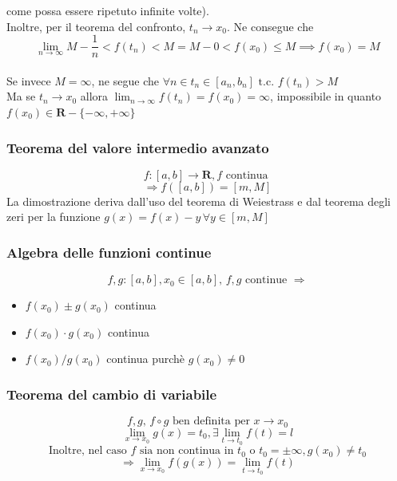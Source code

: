 \documentclass{report}
\begin{document}
                come possa essere ripetuto infinite volte). \\
                Inoltre, per il teorema del confronto, $t_n \rightarrow x_0$. Ne consegue che 
                $$\lim_{n \to \infty} M - \frac{1}{n} < f\left(t_n\right) < M = M - 0 < f\left(x_0\right) \leq M \implies f\left(x_0\right) = M$$ \\
                Se invece $M = \infty$, ne segue che $\forall n \in t_n \in \left[a_n, b_n\right] \textrm{ t.c. } f\left(t_n\right) > M$ \\
                Ma se $t_n \rightarrow x_0$ allora $\lim_{n \to \infty} f\left(t_n\right) = f\left(x_0\right) = \infty$, impossibile in 
                quanto $f\left(x_0\right) \in \mathbf{R} - \{-\infty, +\infty\}$
        \subsubsection{Teorema del valore intermedio avanzato}
            $$f: \left[a, b\right] \longrightarrow \mathbf{R}, f \textrm{ continua }$$
            $$\Longrightarrow f\left(\left[a,b\right]\right) = \left[m, M\right]$$
            La dimostrazione deriva dall'uso del teorema di Weiestrass e dal teorema degli 
            zeri per la funzione $g\left(x\right) = f\left(x\right) - y \, \forall y \in \left[m, M\right]$
        \subsubsection{Algebra delle funzioni continue}
            $$f, g: \left[a, b\right], x_0 \in \left[a, b\right], \, f, g \textrm{ continue } \Longrightarrow$$
            \begin{itemize}
                \item $f\left(x_0\right) \pm g\left(x_0\right)$ continua
                \item $f\left(x_0\right) \cdot g\left(x_0\right)$ continua
                \item $f\left(x_0\right) / g\left(x_0\right)$ continua purchè $g\left(x_0\right) \neq 0$
            \end{itemize}
        \subsubsection{Teorema del cambio di variabile}
        $$f, g, \, f \circ g \textrm{ ben definita per }x \rightarrow x_0$$
        $$\lim_{x \to x_0} g\left(x\right) = t_0, \exists \lim_{t \to t_0} f\left(t\right) = l$$
        $$\textrm{Inoltre, nel caso } f \textrm{ sia non continua in } t_0 \textrm{ o }t_0 = \pm \infty, 
            g\left(x_0\right) \neq t_0$$
        $$\Longrightarrow \lim_{x \to x_0} f\left(g\left(x\right)\right) = \lim_{t \to t_0} f\left(t\right)$$
\end{document}
